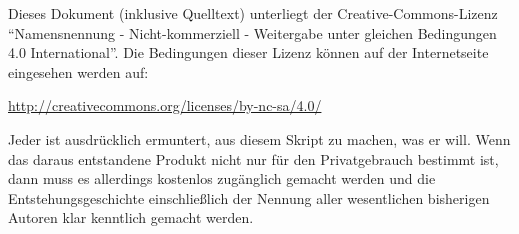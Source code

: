 \documentclass[../main.tex]{subfiles}
\begin{document}
Dieses Dokument (inklusive Quelltext) unterliegt der Creative-Commons-Lizenz "`Namensnennung - Nicht-kommerziell - Weitergabe unter gleichen Bedingungen 4.0 International"'.
Die Bedingungen dieser Lizenz können auf der Internetseite eingesehen werden auf:
\begin{center}
\url{http://creativecommons.org/licenses/by-nc-sa/4.0/}
\end{center}
Jeder ist ausdrücklich ermuntert, aus diesem Skript zu machen, was er will.
Wenn das daraus entstandene Produkt nicht nur für den Privatgebrauch
bestimmt ist, dann muss es allerdings kostenlos zugänglich gemacht werden und die
Entstehungsgeschichte einschließlich der Nennung aller wesentlichen bisherigen Autoren klar kenntlich gemacht werden.
\end{document}
